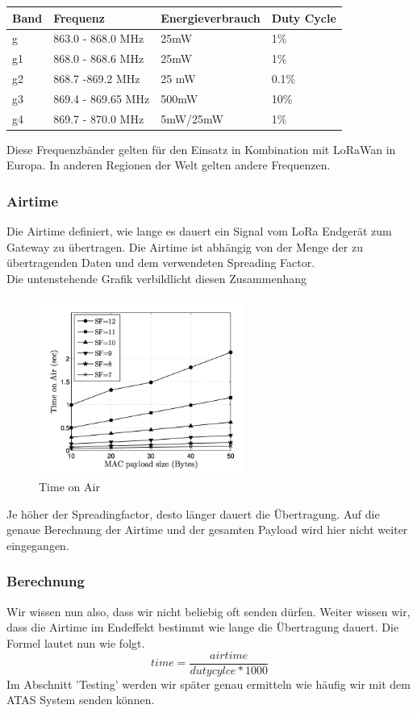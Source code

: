 \documentclass[11pt,english,german]{report}
\theoremstyle{definition}
\begin{document}
\begin{tabularx}{\linewidth}{XXXX}
	\textbf{Band} & \textbf{Frequenz} & \textbf{Energieverbrauch} & \textbf{Duty Cycle} \\ \hline
	g &863.0 - 868.0 MHz & 25mW&1\%\\ \hline
	g1 &868.0 - 868.6 MHz & 25mW& 1\%\\ \hline
	g2 &868.7 -869.2 MHz & 25 mW& 0.1\%\\ \hline
	g3 &869.4 - 869.65 MHz & 500mW& 10\%\\ \hline
	g4 &869.7 - 870.0 MHz & 5mW/25mW& 1\%\\ \hline
\end{tabularx} 
\noindent
Diese Frequenzbänder gelten für den Einsatz in Kombination mit LoRaWan in Europa. In anderen Regionen der Welt gelten andere Frequenzen.

\newpage
\subsubsection{Airtime}
Die Airtime definiert, wie lange es dauert ein Signal vom LoRa Endgerät zum Gateway zu übertragen. Die Airtime ist abhängig von der Menge der zu übertragenden Daten und dem verwendeten Spreading Factor.\\[0.3cm]
Die untenstehende Grafik verbildlicht diesen Zusammenhang
\begin{figure}[H]
	\centering
	\includegraphics[width=0.6\textwidth]{img/lora/timeonair.png}
	\caption[Time on Air]
	{Time on Air}
\end{figure}
\noindent
Je höher der Spreadingfactor, desto länger dauert die Übertragung. Auf die genaue Berechnung der Airtime und der gesamten Payload wird hier nicht weiter eingegangen.

\subsubsection{Berechnung}
Wir wissen nun also, dass wir nicht beliebig oft senden dürfen. Weiter wissen wir, dass die Airtime im Endeffekt bestimmt wie lange die Übertragung dauert. Die Formel lautet nun wie folgt.
\begin{equation*}time = \frac{airtime}{dutycylce * 1000}\end{equation*}
Im Abschnitt 'Testing' werden wir später genau ermitteln wie häufig wir mit dem ATAS System senden können.
\end{document}
